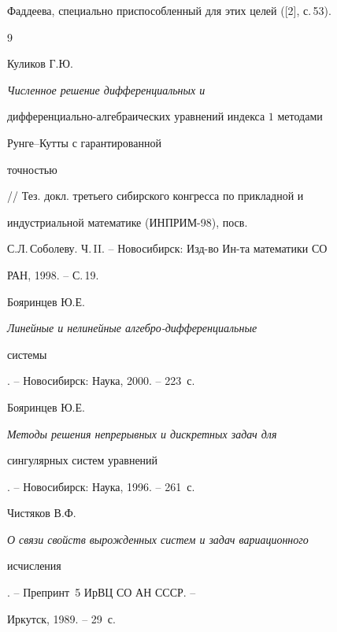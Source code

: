 Фаддеева, специально приспособленный для этих целей ([2], с.\,53). 


 


\begin{thebibliography}{9} 


 




Куликов Г.Ю. {\em Численное решение дифференциальных и 


дифференциально-алгебраических уравнений индекса $1$ методами 


Рунге--Кутты с гарантированной 


точностью} // Тез. докл. третьего сибирского конгресса по прикладной и 


индустриальной математике (ИНПРИМ-98), посв. 


С.Л.\,Соболеву. Ч.\,II. -- Новосибирск: Изд-во Ин-та математики СО 


РАН, 1998. -- С.\,19. 




Бояринцев Ю.Е. {\em Линейные и нелинейные алгебро-дифференциальные 


системы}. -- Новосибирск: Наука, 2000. -- 223~с. 




Бояринцев Ю.Е. {\em Методы решения непрерывных и дискретных задач для 


сингулярных систем уравнений}. -- Новосибирск: Наука, 1996. -- 261~с. 




Чистяков В.Ф. {\em О связи свойств вырожденных систем и задач вариационного 


исчисления}. -- Препринт \No\,5 ИрВЦ СО АН СССР. -- 


Иркутск, 1989. -- 29~с. 


 


 


\end{thebibliography} 


 


\vskip 2cm 


 










 


\label{end} 


 


